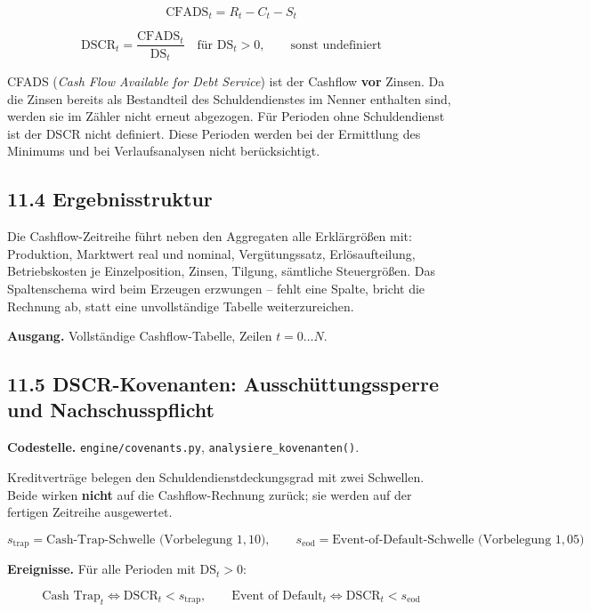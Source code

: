 \documentclass[
  a4paper,
  10pt]{article}
\begin{document}
\[ \mathrm{CFADS}_t = R_t - C_t - S_t \]

\[ \mathrm{DSCR}_t = \frac{\mathrm{CFADS}_t}{\mathrm{DS}_t} \quad \text{für } \mathrm{DS}_t > 0, \qquad \text{sonst undefiniert} \]

CFADS (\emph{Cash Flow Available for Debt Service}) ist der Cashflow
\textbf{vor} Zinsen. Da die Zinsen bereits als Bestandteil des
Schuldendienstes im Nenner enthalten sind, werden sie im Zähler nicht
erneut abgezogen. Für Perioden ohne Schuldendienst ist der DSCR nicht
definiert. Diese Perioden werden bei der Ermittlung des Minimums und bei
Verlaufsanalysen nicht berücksichtigt.

\hypertarget{ergebnisstruktur}{%
\subsection{11.4 Ergebnisstruktur}\label{ergebnisstruktur}}

Die Cashflow-Zeitreihe führt neben den Aggregaten alle Erklärgrößen mit:
Produktion, Marktwert real und nominal, Vergütungssatz, Erlösaufteilung,
Betriebskosten je Einzelposition, Zinsen, Tilgung, sämtliche
Steuergrößen. Das Spaltenschema wird beim Erzeugen erzwungen -- fehlt
eine Spalte, bricht die Rechnung ab, statt eine unvollständige Tabelle
weiterzureichen.

\textbf{Ausgang.} Vollständige Cashflow-Tabelle, Zeilen
\(t = 0 \dots N\).

\hypertarget{dscr-kovenanten-ausschuxfcttungssperre-und-nachschusspflicht}{%
\subsection{11.5 DSCR-Kovenanten: Ausschüttungssperre und
Nachschusspflicht}\label{dscr-kovenanten-ausschuxfcttungssperre-und-nachschusspflicht}}

\textbf{Codestelle.} \nolinkurl{engine/covenants.py},
\texttt{analysiere\_kovenanten()}.

Kreditverträge belegen den Schuldendienstdeckungsgrad mit zwei
Schwellen. Beide wirken \textbf{nicht} auf die Cashflow-Rechnung zurück;
sie werden auf der fertigen Zeitreihe ausgewertet.

\[ s_{\mathrm{trap}} = \text{Cash-Trap-Schwelle (Vorbelegung } 1{,}10\text{)}, \qquad s_{\mathrm{eod}} = \text{Event-of-Default-Schwelle (Vorbelegung } 1{,}05\text{)} \]

\textbf{Ereignisse.} Für alle Perioden mit \(\mathrm{DS}_t > 0\):

\[ \text{Cash Trap}_t \iff \mathrm{DSCR}_t < s_{\mathrm{trap}}, \qquad \text{Event of Default}_t \iff \mathrm{DSCR}_t < s_{\mathrm{eod}} \]
\end{document}
